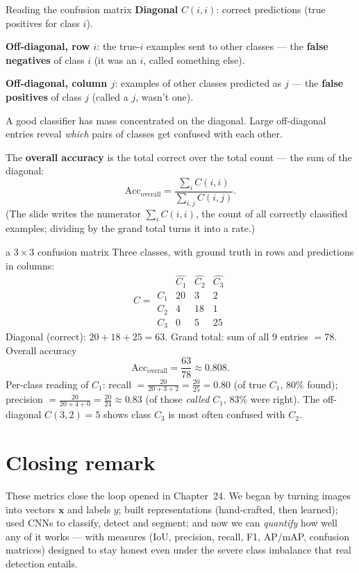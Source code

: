 \documentclass{report}
\newcommand{\xvec}{\mathbf{x}}
\begin{document}
\begin{defbox}{Reading the confusion matrix}
\textbf{Diagonal} $C(i,i)$: correct predictions (true positives for class $i$).

\medskip
\textbf{Off-diagonal, row $i$}: the true-$i$ examples sent to other classes ---
the \textbf{false negatives} of class $i$ (it was an $i$, called something
else).

\medskip
\textbf{Off-diagonal, column $j$}: examples of other classes predicted as $j$
--- the \textbf{false positives} of class $j$ (called a $j$, wasn't one).

\medskip
A good classifier has mass concentrated on the diagonal. Large off-diagonal
entries reveal \emph{which} pairs of classes get confused with each other.
\end{defbox}

The \textbf{overall accuracy} is the total correct over the total count --- the
sum of the diagonal:
\[
\text{Acc}_{\text{overall}} = \frac{\sum_i C(i,i)}{\sum_{i,j} C(i,j)} .
\]
(The slide writes the numerator $\sum_i C(i,i)$, the count of all correctly
classified examples; dividing by the grand total turns it into a rate.)

\begin{exbox}{a $3\times3$ confusion matrix}
Three classes, with ground truth in rows and predictions in columns:
\[
C =
\begin{array}{c|ccc}
 & \hat{C_1} & \hat{C_2} & \hat{C_3} \\ \hline
C_1 & 20 & 3 & 2 \\
C_2 & 4 & 18 & 1 \\
C_3 & 0 & 5 & 25
\end{array}
\]
Diagonal (correct): $20+18+25 = 63$. Grand total: sum of all $9$ entries
$= 78$. Overall accuracy
\[
\text{Acc}_{\text{overall}} = \frac{63}{78} \approx 0.808 .
\]
Per-class reading of $C_1$: recall $= \tfrac{20}{20+3+2} = \tfrac{20}{25}=0.80$
(of true $C_1$, $80\%$ found); precision $= \tfrac{20}{20+4+0} =
\tfrac{20}{24}\approx 0.83$ (of those \emph{called} $C_1$, $83\%$ were right).
The off-diagonal $C(3,2)=5$ shows class $C_3$ is most often confused with
$C_2$.
\end{exbox}

\section*{Closing remark}

These metrics close the loop opened in Chapter~24. We began by turning images
into vectors $\xvec$ and labels $y$; built representations (hand-crafted, then
learned); used CNNs to classify, detect and segment; and now we can
\emph{quantify} how well any of it works --- with measures (IoU, precision,
recall, F1, AP/mAP, confusion matrices) designed to stay honest even under the
severe class imbalance that real detection entails.
\end{document}
